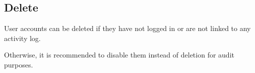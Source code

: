 \documentclass[a4paper]{article}
\begin{document}
\hypertarget{toc185}{}
\subsection{Delete}

User accounts can be deleted if they have not logged in or are not linked to any activity log.

Otherwise, it is recommended to disable them instead of deletion for audit purposes.

\end{document}
